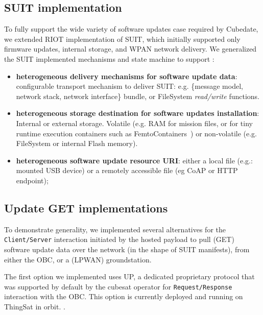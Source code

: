 \subsection{SUIT implementation}

To fully support the wide variety of software updates case required by Cubedate, we extended RIOT implementation of SUIT, which initially supported only firmware updates, internal storage, and WPAN network delivery. We generalized the SUIT implemented mechanisms and state machine to support :

\begin{itemize}
    \item \textbf{heterogeneous delivery mechanisms for software update data}: configurable transport mechanism to deliver SUIT:
    e.g. \{message model, network stack, network interface\}
    bundle, or FileSystem \textit{read/write} functions.
    \item \textbf{heterogeneous storage destination for software updates installation}: Internal or external storage. Volatile 
     (e.g. RAM for mission files, or for tiny runtime execution containers such as FemtoContainers~\cite{zandberg2021femto})
    or non-volatile (e.g. FileSystem or internal Flash memory).
     \item \textbf{heterogeneous software update resource URI}: either a local file (e.g.: mounted USB device) or a remotely accessible file (eg CoAP or HTTP endpoint);
\end{itemize}

\subsection{Update GET implementations}

To demonstrate generality, we implemented several alternatives for the \texttt{Client/Server} interaction initiated by the hosted payload to pull (GET) software update data over the network (in the shape of SUIT manifests), from either the OBC, or a (LPWAN) groundstation.

The first option we implemented uses UP, a dedicated proprietary protocol that was supported by default by the cubesat operator for \texttt{Request/Response} interaction with the OBC. This option is currently deployed and running on ThingSat in orbit. .

